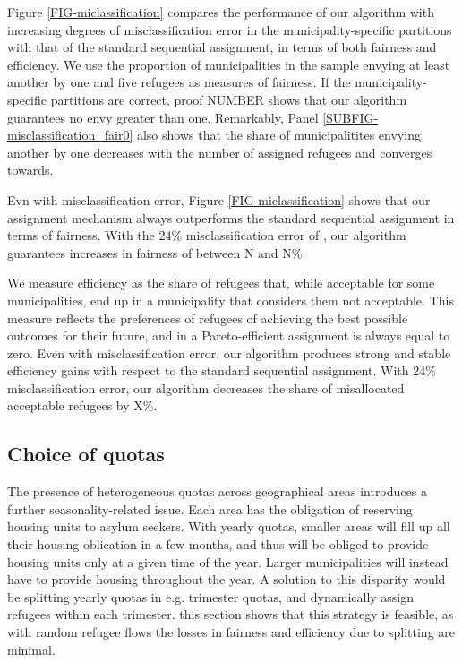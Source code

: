 \documentclass[11pt]{article}
\begin{document}
Figure \ref{FIG-miclassification} compares the performance of our algorithm with increasing degrees of misclassification error in the municipality-specific partitions with that of the standard sequential assignment, in terms of both fairness and efficiency. We use the proportion of municipalities in the sample envying at least another by one and five refugees as measures of fairness. If the municipality-specific partitions are correct, proof NUMBER shows that our algorithm guarantees no envy greater than one. Remarkably, Panel \ref{SUBFIG-misclassification_fair0} also shows that the share of municipalitites envying another by one decreases with the number of assigned refugees and converges towards.

Evn with misclassification error, Figure \ref{FIG-miclassification} shows that our assignment mechanism always outperforms the standard sequential assignment in terms of fairness. With the 24\% misclassification error of \cite{bansak_improving_2018}, our algorithm guarantees increases in fairness of between N and N\%.

We measure efficiency as the share of refugees that, while acceptable for some municipalities, end up in a municipality that considers them not acceptable. This measure reflects the preferences of refugees of achieving the best possible outcomes for their future, and in a Pareto-efficient assignment is always equal to zero. Even with misclassification error, our algorithm produces strong and stable efficiency gains with respect to the standard sequential assignment. With 24\% misclassification error, our algorithm decreases the share of misallocated acceptable refugees by X\%.

\subsection{Choice of quotas}

The presence of heterogeneous quotas across geographical areas introduces a further seasonality-related issue. Each area has the obligation of reserving housing units to asylum seekers. With yearly quotas, smaller areas will fill up all their housing oblication in a few months, and thus will be obliged to provide housing  units only at a given time of the year. Larger municipalities will instead have to provide housing throughout the year. A solution to this disparity would be splitting yearly quotas in e.g. trimester quotas, and dynamically assign refugees within each trimester. this section shows that this strategy is feasible, as with random refugee flows the losses in fairness and efficiency due to splitting are minimal.
\end{document}
